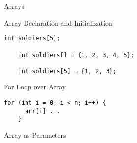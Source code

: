 \begin{frame}{}
  \centerline{\LARGE Arrays}
\end{frame}

\begin{frame}[fragile]{Array Declaration and Initialization}
  \begin{lstlisting}[style = Cstyle]
    int soldiers[5];

    int soldiers[] = {1, 2, 3, 4, 5};

    int soldiers[5] = {1, 2, 3};
  \end{lstlisting}
\end{frame}

\begin{frame}[fragile]{For Loop over Array}
  \begin{lstlisting}[style = Cstyle]
    for (int i = 0; i < n; i++) {
      arr[i] ...
    }
  \end{lstlisting}
\end{frame}

\begin{frame}{Array as Parameters}
\end{frame}
